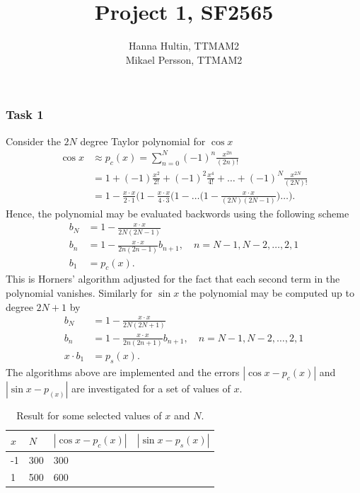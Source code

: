 \documentclass[a4paper,10pt]{article}
\title{Project 1, SF2565}
\author{Hanna Hultin, TTMAM2 \\ Mikael Persson, TTMAM2}
\begin{document}
\maketitle

\subsubsection*{Task 1}
Consider the $2N$ degree Taylor polynomial for  $\cos x$
\begin{align*}
  \cos x &\approx p_c(x) = \sum_{n=0}^{N} (-1)^n \frac{x^{2n}}{(2n)!} \\ 
  \quad &= 1 + (-1) \frac{x^2}{2!} + (-1)^2 \frac{x^4}{4!} + \dots + (-1)^N \frac{x^{2N}}{(2N)!}
  \\
  &= 1 - \frac{x\cdot x}{2\cdot 1} \Big(1 - \frac{x \cdot x}{ 4 \cdot 3} \Big( 
  1 - \dots \Big(1- \frac{x \cdot x}{(2N)(2N-1)}\Big)\dots \Big).
\end{align*}
Hence, the polynomial may be evaluated backwords using the following scheme
\begin{align*}
  b_N &= 1-\frac{x \cdot x}{2N(2N-1)} \\
  b_n &= 1-\frac{x\cdot x}{2n(2n-1)}b_{n+1},\quad n = N-1,N-2,\dots,2,1 \\
  b_1 &= p_c(x).
\end{align*}
This is Horners' algorithm adjusted for the fact that each second term in the polynomial vanishes.
Similarly for $\sin x$ the polynomial may be computed up to degree $2N+1$ by
\begin{align*}
  b_N &= 1-\frac{x \cdot x}{2N(2N+1)} \\
  b_n &= 1-\frac{x\cdot x}{2n(2n+1)}b_{n+1},\quad n = N-1,N-2,\dots,2,1 \\
  x\cdot b_1 &= p_s(x).
\end{align*}
The algorithms above are implemented and the errors 
$|\cos x - p_c(x)|$ and $|\sin x - p_(x)|$ are 
investigated for a set of values of $x$.
\begin{table}[!ht]
\centering 
  \begin{minipage}[t]{105mm}
    \caption{
      Result for some selected values of $x$ and $N$.
    } 
    \label{TABtask1}
  \end{minipage}

  \vspace{5mm}
  \begin{tabular}{l l l l} 
    $x$&$N$&$|\cos x - p_c(x)|$ & $|\sin x - p_s(x)|$\\ 
    \hline
    -1	& 300	& 300 	\\
    1   & 500	& 600	\\
    \hline 
  \end{tabular}
\end{table}
\end{document}
